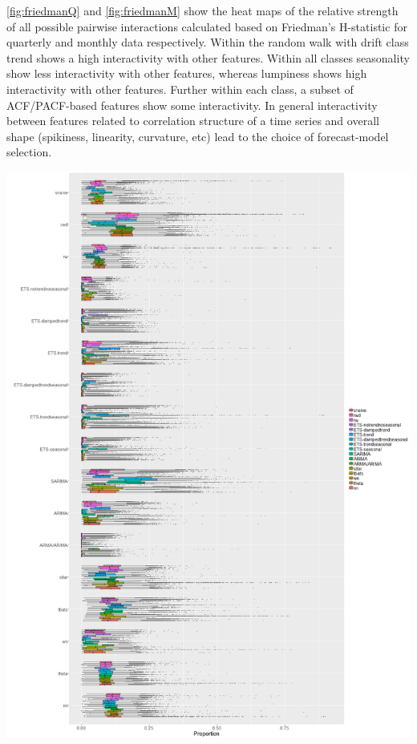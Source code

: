 \documentclass[11pt,a4paper,]{article}
\begin{document}
\autoref{fig:friedmanQ} and \autoref{fig:friedmanM} show the heat maps
of the relative strength of all possible pairwise interactions
calculated based on Friedman's H-statistic for quarterly and monthly
data respectively. Within the random walk with drift class trend shows a
high interactivity with other features. Within all classes seasonality
show less interactivity with other features, whereas lumpiness shows
high interactivity with other features. Further within each class, a
subset of ACF/PACF-based features show some interactivity. In general
interactivity between features related to correlation structure of a
time series and overall shape (spikiness, linearity, curvature, etc)
lead to the choice of forecast-model selection.

\includegraphics{figures/oobquarterly-1.png}

\clearpage
\end{document}
